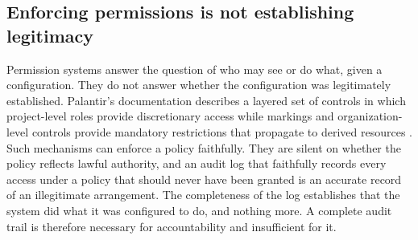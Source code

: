 \documentclass[11pt]{article}
\theoremstyle{plain}
\theoremstyle{definition}
\theoremstyle{remark}
\begin{document}
\subsection{Enforcing permissions is not establishing legitimacy}

Permission systems answer the question of who may see or do what, given a configuration. They do not answer whether the configuration was legitimately established. Palantir's documentation describes a layered set of controls in which project-level roles provide discretionary access while markings and organization-level controls provide mandatory restrictions that propagate to derived resources \cite{palantirMarkings}. Such mechanisms can enforce a policy faithfully. They are silent on whether the policy reflects lawful authority, and an audit log that faithfully records every access under a policy that should never have been granted is an accurate record of an illegitimate arrangement. The completeness of the log establishes that the system did what it was configured to do, and nothing more. A complete audit trail is therefore necessary for accountability and insufficient for it.
\end{document}
